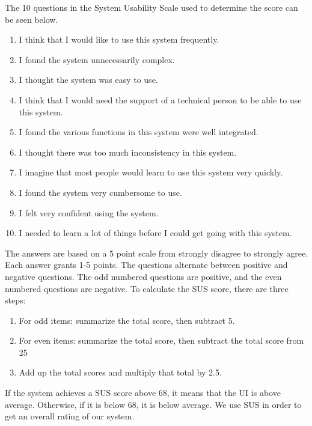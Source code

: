 The 10 questions in the System Usability Scale used to determine the score can be seen below.
\begin{enumerate}
	\item I think that I would like to use this system frequently.
	\item I found the system unnecessarily complex.
	\item I thought the system was easy to use.
	\item I think that I would need the support of a technical person to be able to use this system.
	\item I found the various functions in this system were well integrated.
	\item I thought there was too much inconsistency in this system.
	\item I imagine that most people would learn to use this system very quickly.
	\item I found the system very cumbersome to use.
	\item I felt very confident using the system.
	\item I needed to learn a lot of things before I could get going with this system.
\end{enumerate}
The answers are based on a 5 point scale from strongly disagree to strongly agree.
Each answer grants 1-5 points.
The questions alternate between positive and negative questions. The odd numbered questions are positive, and the even numbered questions are negative.\cite{adobeSUS}
To calculate the SUS score, there are three steps:
\begin{enumerate}
	\item For odd items: summarize the total score, then subtract 5.
	\item For even items: summarize the total score, then subtract the total score from 25
	\item Add up the total scores and multiply that total by 2.5.
\end{enumerate}
If the system achieves a SUS score above 68, it means that the UI is above average. Otherwise, if it is below 68, it is below average\cite{adobeSUS}.
We use SUS in order to get an overall rating of our system.

